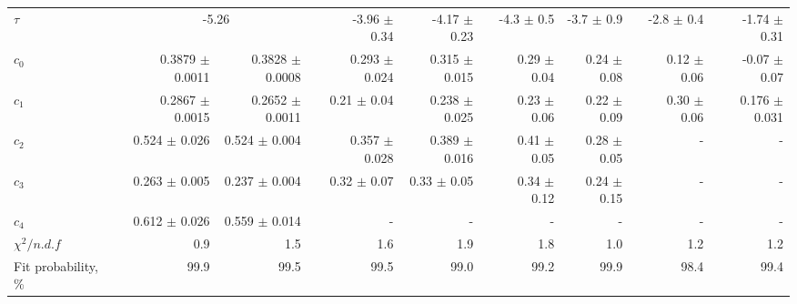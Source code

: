 \begin{table}[H]
{{\begin{tabular}{lrrrrrrrrrrrr}
    \rule{0pt}{4ex}\rule{0pt}{4ex}$\tau$  && \multicolumn{2}{c}{-5.26} && -3.96 $\pm$ 0.34 & -4.17 $\pm$ 0.23 && -4.3 $\pm$ 0.5 & -3.7 $\pm$ 0.9 && -2.8 $\pm$ 0.4 & -1.74 $\pm$ 0.31 \\
    $c_0$  && 0.3879 $\pm$ 0.0011 & 0.3828 $\pm$ 0.0008 && 0.293 $\pm$ 0.024 & 0.315 $\pm$ 0.015 && 0.29 $\pm$ 0.04 & 0.24 $\pm$ 0.08 && 0.12 $\pm$ 0.06 & -0.07 $\pm$ 0.07 \\
    $c_1$  && 0.2867 $\pm$ 0.0015 & 0.2652 $\pm$ 0.0011 && 0.21 $\pm$ 0.04 & 0.238 $\pm$ 0.025 && 0.23 $\pm$ 0.06 & 0.22 $\pm$ 0.09 && 0.30 $\pm$ 0.06 & 0.176 $\pm$ 0.031 \\
    $c_2$  && 0.524 $\pm$ 0.026 & 0.524 $\pm$ 0.004 && 0.357 $\pm$ 0.028 & 0.389 $\pm$ 0.016 && 0.41 $\pm$ 0.05 & 0.28 $\pm$ 0.05 &&  -  &  -  \\
    $c_3$  && 0.263 $\pm$ 0.005 & 0.237 $\pm$ 0.004 && 0.32 $\pm$ 0.07 & 0.33 $\pm$ 0.05 && 0.34 $\pm$ 0.12 & 0.24 $\pm$ 0.15 &&  -  &  -  \\
    $c_4$  && 0.612 $\pm$ 0.026 & 0.559 $\pm$ 0.014 &&  -  &  -  &&  -  &  -  &&  -  &  -  \\

    \rule{0pt}{4ex}$\chi^2 / n.d.f$  && 0.9 & 1.5 && 1.6 & 1.9 && 1.8 & 1.0 && 1.2 & 1.2 \\
    Fit probability, \%  && 99.9 & 99.5 && 99.5 & 99.0 && 99.2 & 99.9 && 98.4 & 99.4 \\
    \bottomrule
\end{tabular}
}
}
\end{table}
